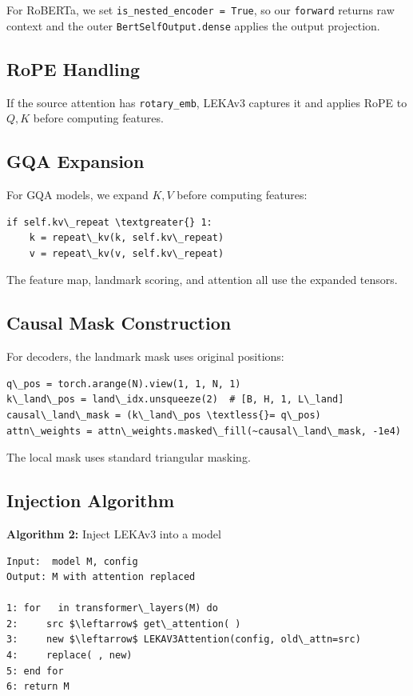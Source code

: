 For RoBERTa, we set \texttt{is\_nested\_encoder = True}, so our \texttt{forward} returns raw 
context and the outer \texttt{BertSelfOutput.dense} applies the output projection.

\subsection{RoPE Handling}

If the source attention has \texttt{rotary\_emb}, LEKAv3 captures it and applies 
RoPE to $Q, K$ before computing features.

\subsection{GQA Expansion}

For GQA models, we expand $K, V$ before computing features:

\begin{lstlisting}
if self.kv\_repeat \textgreater{} 1:
    k = repeat\_kv(k, self.kv\_repeat)
    v = repeat\_kv(v, self.kv\_repeat)
\end{lstlisting}

The feature map, landmark scoring, and attention all use the expanded tensors.

\subsection{Causal Mask Construction}

For decoders, the landmark mask uses original positions:

\begin{lstlisting}
q\_pos = torch.arange(N).view(1, 1, N, 1)
k\_land\_pos = land\_idx.unsqueeze(2)  # [B, H, 1, L\_land]
causal\_land\_mask = (k\_land\_pos \textless{}= q\_pos)
attn\_weights = attn\_weights.masked\_fill(~causal\_land\_mask, -1e4)
\end{lstlisting}

The local mask uses standard triangular masking.

\subsection{Injection Algorithm}

\textbf{Algorithm 2:} Inject LEKAv3 into a model
\begin{lstlisting}
Input:  model M, config
Output: M with attention replaced

1: for   in transformer\_layers(M) do
2:     src $\leftarrow$ get\_attention( )
3:     new $\leftarrow$ LEKAV3Attention(config, old\_attn=src)
4:     replace( , new)
5: end for
6: return M
\end{lstlisting}

